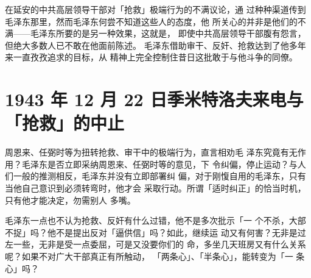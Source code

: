 在延安的中共高层领导干部对「抢救」极端行为的不满议论，通
过种种渠道传到毛泽东那里，然而毛泽东何尝不知道这些人的态度，他
所关心的并非是他们的不满——毛泽东所要的是另一种效果，这就是，
即使中共高层领导干部腹有怨言，但绝大多数人已不敢在他面前陈述。
毛泽东借助审干、反奸、抢救达到了他多年来一直孜孜追求的目标，从
精神上完全控制住昔日这批敢于与他斗争的同僚。

\section{1943 年 12 月 22 日季米特洛夫来电与「抢救」的中止}

周恩来、任弼时等为扭转抢救、审干中的极端行为，直言相劝毛
泽东究竟有无作用？毛泽东是否立即采纳周恩来、任弼时等的意见，下
令纠偏，停止运动？与人们一般的推测相反，毛泽东并没有立即部署纠
偏，对于刚愎自用的毛泽东，只有当他自己意识到必须转弯时，他才会
采取行动。所谓「适时纠正」的恰当时机，只有他才能决定，勿需别人
多嘴。

毛泽东一点也不认为抢救、反奸有什么过错，他不是多次批示「一 个不杀，大部
不捉」吗？他不是提出反对「逼供信」吗？如此，继续运 动又有何害？无非是过
左一些，无非是受一点委屈，可是又没要你们的 命，多坐几天班房又有什么关系
呢？如果不对广大干部真正有所触动， 「两条心」、「半条心」，能转变为「一
条心」吗？

